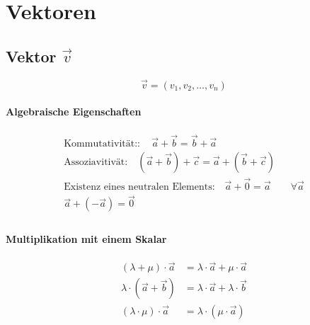
%
%

\section{Vektoren}

\subsection{Vektor $\vec{v}$}
\begin{equation}
\vec{v} = \left( v_1, v_2, \ldots, v_n \right)
\end{equation}

\paragraph{Algebraische Eigenschaften}
\begin{gather}
\text{Kommutativit\"at:}: \quad \vec{a} + \vec{b} = \vec{b} + \vec{a} \\
\text{Assoziavitiv\"at:} \quad
\left(\vec{a} + \vec{b}\right) + \vec{c} = \vec{a} + \left(\vec{b} + \vec{c}\right) \\
\text{Existenz eines neutralen Elements:} \quad
\vec{a} + \vec{0} = \vec{a} \qquad \forall \vec{a} \\
\vec{a} + \left(-\vec{a}\right) = \vec{0} \\
\end{gather}

\paragraph{Multiplikation mit einem Skalar}
\begin{align}
  \left(\lambda+\mu\right)\cdot\vec{a} & = \lambda\cdot\vec{a} + \mu\cdot\vec{a} \\
  \lambda\cdot\left(\vec{a}+\vec{b}\right) & = \lambda\cdot\vec{a}+\lambda\cdot\vec{b} \\
  \left(\lambda\cdot\mu\right)\cdot\vec{a} & = \lambda\cdot\left(\mu\cdot\vec{a}\right)
\end{align}

